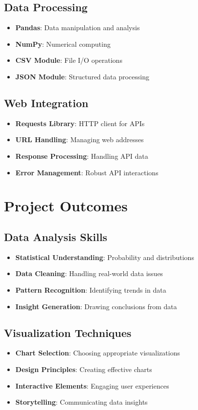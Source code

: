 \subsection*{Data Processing}
\begin{itemize}
    \item \textbf{Pandas}: Data manipulation and analysis
    \item \textbf{NumPy}: Numerical computing
    \item \textbf{CSV Module}: File I/O operations
    \item \textbf{JSON Module}: Structured data processing
\end{itemize}

\subsection*{Web Integration}
\begin{itemize}
    \item \textbf{Requests Library}: HTTP client for APIs
    \item \textbf{URL Handling}: Managing web addresses
    \item \textbf{Response Processing}: Handling API data
    \item \textbf{Error Management}: Robust API interactions
\end{itemize}

\section*{Project Outcomes}

\subsection*{Data Analysis Skills}
\begin{itemize}
    \item \textbf{Statistical Understanding}: Probability and distributions
    \item \textbf{Data Cleaning}: Handling real-world data issues
    \item \textbf{Pattern Recognition}: Identifying trends in data
    \item \textbf{Insight Generation}: Drawing conclusions from data
\end{itemize}

\subsection*{Visualization Techniques}
\begin{itemize}
    \item \textbf{Chart Selection}: Choosing appropriate visualizations
    \item \textbf{Design Principles}: Creating effective charts
    \item \textbf{Interactive Elements}: Engaging user experiences
    \item \textbf{Storytelling}: Communicating data insights
\end{itemize}

